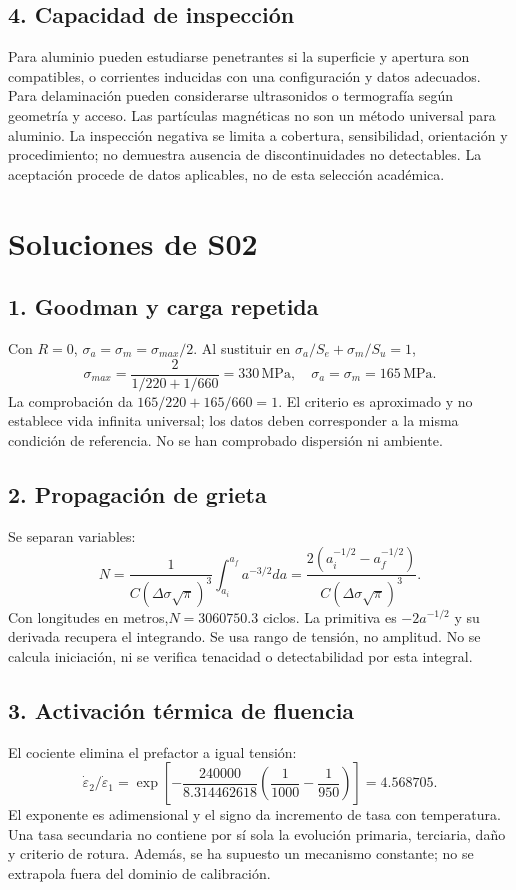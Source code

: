 \section{4. Capacidad de inspección}
Para aluminio pueden estudiarse penetrantes si la superficie y apertura son compatibles, o corrientes inducidas con una configuración y datos adecuados. Para delaminación pueden considerarse ultrasonidos o termografía según geometría y acceso. Las partículas magnéticas no son un método universal para aluminio. La inspección negativa se limita a cobertura, sensibilidad, orientación y procedimiento; no demuestra ausencia de discontinuidades no detectables. La aceptación procede de datos aplicables, no de esta selección académica.

\chapter{Soluciones de S02}
\section{1. Goodman y carga repetida}
Con $R=0$, $\sigma_a=\sigma_m=\sigma_{max}/2$. Al sustituir en $\sigma_a/S_e+\sigma_m/S_u=1$,
\[\sigma_{max}=\frac{2}{1/220+1/660}=330\,\mathrm{MPa},\quad \sigma_a=\sigma_m=165\,\mathrm{MPa}.\]
La comprobación da $165/220+165/660=1$. El criterio es aproximado y no establece vida infinita universal; los datos deben corresponder a la misma condición de referencia. No se han comprobado dispersión ni ambiente.



\section{2. Propagación de grieta}
Se separan variables:
\[N=\frac{1}{C(\Delta\sigma\sqrt\pi)^3}\int_{a_i}^{a_f}a^{-3/2}da=\frac{2(a_i^{-1/2}-a_f^{-1/2})}{C(\Delta\sigma\sqrt\pi)^3}.\]
Con longitudes en metros,$N=3060750.3$ ciclos. La primitiva es $-2a^{-1/2}$ y su derivada recupera el integrando. Se usa rango de tensión, no amplitud. No se calcula iniciación, ni se verifica tenacidad o detectabilidad por esta integral.



\section{3. Activación térmica de fluencia}
El cociente elimina el prefactor a igual tensión:
\[\dot\varepsilon_2/\dot\varepsilon_1=\exp\left[-\frac{240000}{8.314462618}\left(\frac1{1000}-\frac1{950}\right)\right]=4.568705.\]
El exponente es adimensional y el signo da incremento de tasa con temperatura. Una tasa secundaria no contiene por sí sola la evolución primaria, terciaria, daño y criterio de rotura. Además, se ha supuesto un mecanismo constante; no se extrapola fuera del dominio de calibración.


